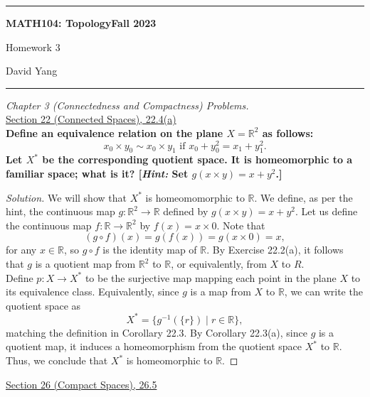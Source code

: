 \documentclass[11pt]{article}
\newcommand{\R}{\mathbb{R}}
\newenvironment{solution}
  {\renewcommand\qedsymbol{$\blacksquare$}\begin{proof}[Solution]}
  {\end{proof}}
\begin{document}
	\hrule
	\begin{center}
        \textbf{MATH104: Topology}\hfill \textbf{Fall 2023}\newline

		{\Large Homework 3}

		David Yang
	\end{center}

\hrule

\vspace{1em}

\textit{Chapter 3 (Connectedness and Compactness) Problems.} \\

\underline{Section 22 (Connected Spaces), 22.4(a)} \\

\textbf{Define an equivalence relation on the plane $X = \R^2$ as follows:}
\[
	x_0 \times y_0 \sim x_0 \times y_1 \text{ if } x_0 + y_0^2 = x_1 + y_1^2.
\]
\textbf{Let $X^*$ be the corresponding quotient space. It is homeomorphic to a familiar space; what is it?
[\textit{Hint:} Set $g(x \times y) = x + y^2$.]} \\

\begin{solution}
We will show that $X^*$ is homeomomorphic to $\R$. We define, as per the hint, the continuous map $g\colon \R^2 \rightarrow \R$ defined by
$g(x \times y) = x + y^2$. Let us define the continuous map $f \colon \R \rightarrow \R^2$ by $f(x) = x \times 0$. Note that
\[
	(g \circ f)(x) = g(f(x)) = g(x \times 0) = x,
\]
for any $x \in \R$, so $g \circ f$ is the identity map of $\R$. By Exercise 22.2(a), it follows that $g$ is a quotient map from $\R^2$ to $\R$,
or equivalently, from $X$ to $R$. \\

Define $p \colon X \rightarrow X^*$ to be the surjective map mapping each point in the plane $X$ to its equivalence class. Equivalently,
since $g$ is a map from $X$ to $\R$, we can write the quotient space as
\[
	X^* = \{ g^{-1}(\{ r \}) \mid r \in \R\},
\]
matching the definition in Corollary 22.3. By Corollary 22.3(a), since $g$ is a quotient map, 
it induces a homeomorphism from the quotient space $X^*$ to $\R$. \\

Thus, we conclude that $X^*$ is homeomorphic to $\R$.
\end{solution}

\newpage

\underline{Section 26 (Compact Spaces), 26.5} \\
\end{document}
